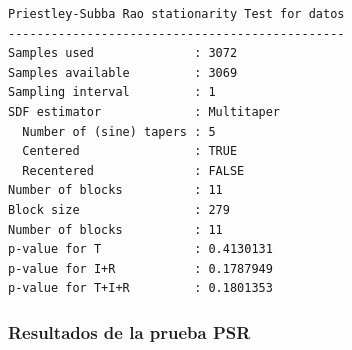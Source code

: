 \documentclass[serif,mathserif,professionalfont]{beamer}
\begin{document}
\begin{lrbox}{\caja}%
\begin{lstlisting}[caption={}]
Priestley-Subba Rao stationarity Test for datos
-----------------------------------------------
Samples used              : 3072 
Samples available         : 3069 
Sampling interval         : 1 
SDF estimator             : Multitaper 
  Number of (sine) tapers : 5 
  Centered                : TRUE 
  Recentered              : FALSE 
Number of blocks          : 11 
Block size                : 279 
Number of blocks          : 11 
p-value for T             : 0.4130131 
p-value for I+R           : 0.1787949 
p-value for T+I+R         : 0.1801353 
\end{lstlisting}
\end{lrbox}%


\begin{frame}[fragile]\frametitle{Resultados de la prueba PSR}
\begin{figure}
\scalebox{0.7}{\usebox{\caja}}
\end{figure}
\end{frame}

%
%



\end{document}
